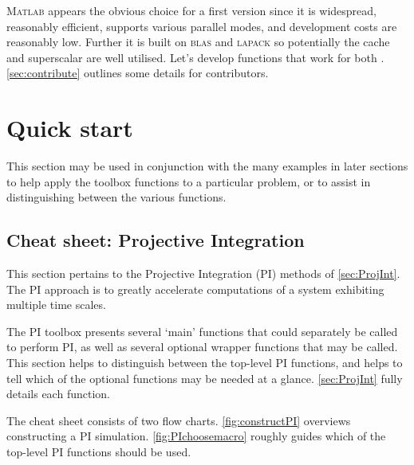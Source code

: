 \textsc{Matlab} appears the obvious choice for a first version since it is widespread, reasonably efficient, supports various parallel modes, and development costs are reasonably low.
Further it is built on \textsc{blas} and \textsc{lapack} so potentially the cache and superscalar \cpu{} are well utilised.
Let's develop functions that work for both \script.
\cref{sec:contribute} outlines some details for contributors.


\chapter{Quick start}
\localtableofcontents
This section may be used in conjunction with the many examples in later sections to help apply the toolbox functions to a particular problem, or to assist in distinguishing between the various functions.

\section{Cheat sheet: Projective Integration}
This section pertains to the Projective Integration (PI) methods of \cref{sec:ProjInt}. The PI approach is to greatly accelerate computations of a system exhibiting multiple time scales.

The PI toolbox presents several `main' functions that could separately be called to perform PI, as well as several optional wrapper functions that may be called. This section helps to distinguish between the top-level PI functions, and helps to tell which of the optional functions may be needed at a glance. \cref{sec:ProjInt} fully details each function.

The cheat sheet consists of two flow charts. \cref{fig:constructPI} overviews constructing a PI simulation. \cref{fig:PIchoosemacro} roughly guides which of the top-level PI functions should be used.

